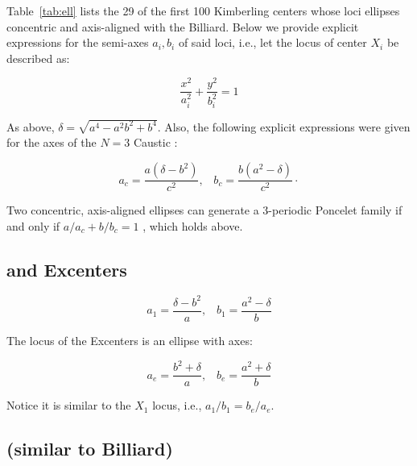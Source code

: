 Table~\ref{tab:ell} lists the 29 of the first 100 Kimberling centers whose loci ellipses concentric and axis-aligned with the Billiard. Below we provide explicit expressions for the semi-axes $a_i,b_i$ of said loci, i.e., let the locus of center $X_i$ be described as:

\begin{equation*}
\frac{x^2}{a_{i}^2}+\frac{y^2}{b_{i}^2}=1
\end{equation*}

\noindent As above, $\delta=\sqrt{a^4-a^2b^2+b^4}$. Also, the following explicit expressions were given for the axes of the $N=3$ Caustic \cite{garcia2019-incenter}:

\begin{equation*}
a_c=\frac{a\left(\delta-{b}^{2}\right)}{c^2},\;\;\;
b_c=\frac{b\left({a}^{2}-\delta\right)}{c^2}\cdot
\end{equation*}

Two concentric, axis-aligned ellipses can generate a 3-periodic Poncelet family if and only if $a/a_c+b/b_c=1$ \cite{griffiths1978}, which holds above.

\subsection{ and Excenters}
 
\begin{equation*}
 a_1=\frac{\delta-{b}^{2}}{a},\;\;\;
 b_1=\frac{{a}^{2}-\delta}{b}
\end{equation*}
 
The locus of the Excenters is an ellipse with axes:
 
\begin{equation*}
 a_e=\frac{{b}^{2}+\delta}{a},\;\;\; 
 b_e=\frac{{a}^{2}+\delta}{b}
\end{equation*}
 
\noindent Notice it is similar to the $X_1$ locus, i.e., $a_1/b_1=b_e/a_e$. 


\subsection{ (similar to Billiard)}

